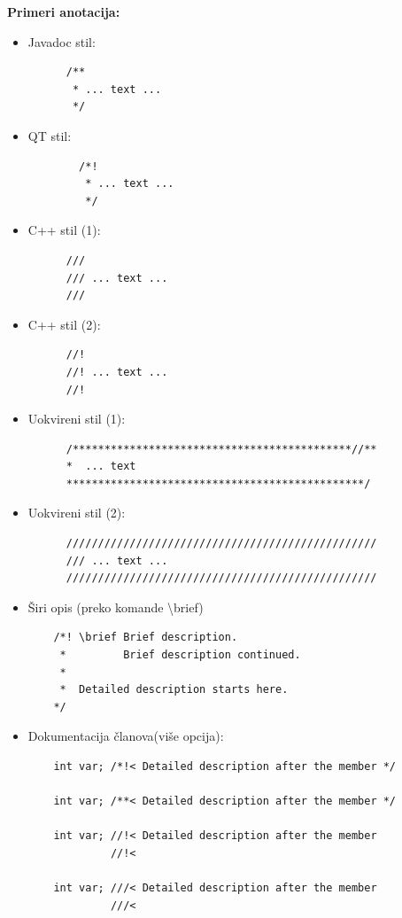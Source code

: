 \documentclass[a4paper]{article}
\begin{document}
  \noindent \textbf{Primeri anotacija:}\cite{doxygen_commentblocks}
  \begin{itemize}
    \item Javadoc stil:
    \begin{lstlisting}
      /**
       * ... text ...
       */\end{lstlisting}
    \item QT stil:
      \begin{lstlisting}
        /*!
         * ... text ...
         */\end{lstlisting}
    \item C++ stil (1):
    \begin{lstlisting}
      /// 
      /// ... text ...
      /// \end{lstlisting}
    \item C++ stil (2):
    \begin{lstlisting}
      //! 
      //! ... text ...
      //! \end{lstlisting}
    \item Uokvireni stil (1):
    \begin{lstlisting}
      /********************************************//**
      *  ... text
      ***********************************************/\end{lstlisting}
    \item Uokvireni stil (2):
    \begin{lstlisting}
      /////////////////////////////////////////////////
      /// ... text ...
      /////////////////////////////////////////////////\end{lstlisting}
    \item Širi opis (preko komande \textbackslash brief)
    \begin{lstlisting}
    /*! \brief Brief description.
     *         Brief description continued.
     *
     *  Detailed description starts here.
    */\end{lstlisting}
    \item Dokumentacija članova(više opcija):
    \begin{lstlisting}
    int var; /*!< Detailed description after the member */
    
    int var; /**< Detailed description after the member */
  
    int var; //!< Detailed description after the member
             //!< 
            
    int var; ///< Detailed description after the member
             ///< 
            

\end{lstlisting}
\end{itemize}
\end{document}

